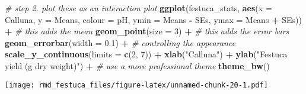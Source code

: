 \documentclass[
]{article}
\newenvironment{Shaded}{\begin{snugshade}}{\end{snugshade}}
\newcommand{\AttributeTok}[1]{\textcolor[rgb]{0.13,0.29,0.53}{#1}}
\newcommand{\CommentTok}[1]{\textcolor[rgb]{0.56,0.35,0.01}{\textit{#1}}}
\newcommand{\DecValTok}[1]{\textcolor[rgb]{0.00,0.00,0.81}{#1}}
\newcommand{\FloatTok}[1]{\textcolor[rgb]{0.00,0.00,0.81}{#1}}
\newcommand{\FunctionTok}[1]{\textcolor[rgb]{0.13,0.29,0.53}{\textbf{#1}}}
\newcommand{\NormalTok}[1]{#1}
\newcommand{\SpecialCharTok}[1]{\textcolor[rgb]{0.81,0.36,0.00}{\textbf{#1}}}
\newcommand{\StringTok}[1]{\textcolor[rgb]{0.31,0.60,0.02}{#1}}
\begin{document}
\begin{Shaded}
\begin{Highlighting}[]
\CommentTok{\# step 2. plot these as an interaction plot}
\FunctionTok{ggplot}\NormalTok{(festuca\_stats, }
       \FunctionTok{aes}\NormalTok{(}\AttributeTok{x =}\NormalTok{ Calluna, }\AttributeTok{y =}\NormalTok{ Means, }\AttributeTok{colour =}\NormalTok{ pH,}
           \AttributeTok{ymin =}\NormalTok{ Means }\SpecialCharTok{{-}}\NormalTok{ SEs, }\AttributeTok{ymax =}\NormalTok{ Means }\SpecialCharTok{+}\NormalTok{ SEs)) }\SpecialCharTok{+}
  \CommentTok{\# this adds the mean}
  \FunctionTok{geom\_point}\NormalTok{(}\AttributeTok{size =} \DecValTok{3}\NormalTok{) }\SpecialCharTok{+}
  \CommentTok{\# this adds the error bars}
  \FunctionTok{geom\_errorbar}\NormalTok{(}\AttributeTok{width =} \FloatTok{0.1}\NormalTok{) }\SpecialCharTok{+}
  \CommentTok{\# controlling the appearance}
  \FunctionTok{scale\_y\_continuous}\NormalTok{(}\AttributeTok{limits =} \FunctionTok{c}\NormalTok{(}\DecValTok{2}\NormalTok{, }\DecValTok{7}\NormalTok{)) }\SpecialCharTok{+} 
  \FunctionTok{xlab}\NormalTok{(}\StringTok{"Calluna"}\NormalTok{) }\SpecialCharTok{+} \FunctionTok{ylab}\NormalTok{(}\StringTok{"Festuca yield (g dry weight)"}\NormalTok{) }\SpecialCharTok{+} 
  \CommentTok{\# use a more professional theme}
  \FunctionTok{theme\_bw}\NormalTok{()}
\end{Highlighting}
\end{Shaded}

\texttt{[image: rmd\_festuca\_files/figure-latex/unnamed-chunk-20-1.pdf]}
\end{document}

